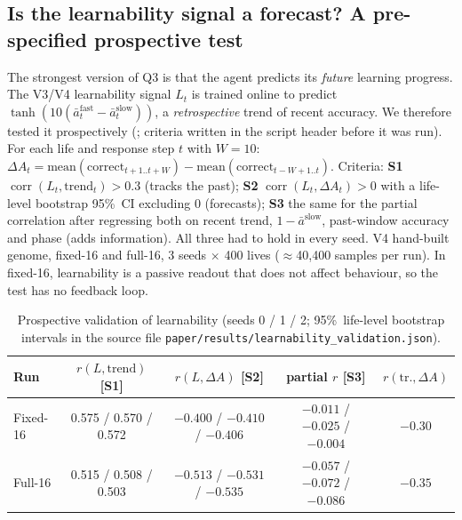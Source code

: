 \documentclass[11pt]{article}
\theoremstyle{remark}
\newcommand{\pct}{\%}
\begin{document}
\subsection{Is the learnability signal a forecast? A pre-specified prospective test}
\label{sec:learnability}
The strongest version of Q3 is that the agent predicts its \emph{future} learning progress. The V3/V4
learnability signal $L_t$ is trained online to predict $\tanh(10(\bar a^{\text{fast}}_t-\bar a^{\text{slow}}_t))$,
a \emph{retrospective} trend of recent accuracy. We therefore tested it prospectively
(; criteria written in the script header before it was run). For each life
and response step $t$ with $W=10$: $\Delta A_t=\text{mean}(\text{correct}_{t+1..t+W})-\text{mean}(\text{correct}_{t-W+1..t})$.
Criteria: \textbf{S1} $\operatorname{corr}(L_t,\text{trend}_t)>0.3$ (tracks the past); \textbf{S2}
$\operatorname{corr}(L_t,\Delta A_t)>0$ with a life-level bootstrap 95\pct\ CI excluding 0 (forecasts); \textbf{S3}
the same for the partial correlation after regressing both on recent trend, $1-\bar a^{\text{slow}}$, past-window
accuracy and phase (adds information). All three had to hold in every seed. V4 hand-built genome, fixed-16 and
full-16, 3 seeds $\times$ 400 lives ($\approx$40{,}400 samples per run). In fixed-16, learnability is a passive
readout that does not affect behaviour, so the test has no feedback loop.

\begin{table}[t]
\centering\footnotesize\setlength{\tabcolsep}{4pt}
\caption{Prospective validation of learnability (seeds 0 / 1 / 2; 95\pct\ life-level bootstrap intervals in the source
file \texttt{paper/results/learnability\_validation.json}).}
\label{tab:learn}
\begin{tabular}{lcccc}
\toprule
Run & $r(L,\text{trend})$ [S1] & $r(L,\Delta A)$ [S2] & partial $r$ [S3] & $r(\text{tr.},\Delta A)$\\
\midrule
Fixed-16 & 0.575 / 0.570 / 0.572 & $-0.400$ / $-0.410$ / $-0.406$ & $-0.011$ / $-0.025$ / $-0.004$ & $-0.30$\\
Full-16 & 0.515 / 0.508 / 0.503 & $-0.513$ / $-0.531$ / $-0.535$ & $-0.057$ / $-0.072$ / $-0.086$ & $-0.35$\\
\bottomrule
\end{tabular}
\end{table}
\end{document}
